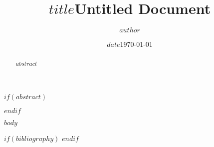 \documentclass[11pt,a4paper,oneside,twocolumn]{article}
\title{$title$}
\title{Untitled Document}
\author{$author$}
\author{}
\date{$date$}
\date{\today}
\begin{document}
\maketitle

$if(abstract)$
\begin{abstract}
$abstract$
\end{abstract}
$endif$

$body$

$if(bibliography)$
\printbibliography[title=References]
$endif$
\end{document}
